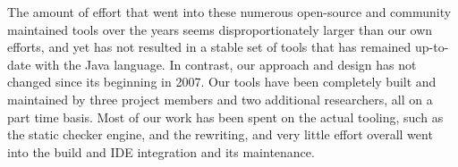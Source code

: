 \documentclass[10pt, conference, compsocconf]{IEEEtran}
\begin{document}
The amount of effort that went into these numerous open-source and
community maintained tools over the years seems disproportionately
larger than our own efforts, and yet has not resulted in a stable set
of tools that has remained up-to-date with the Java language.
In contrast, our
approach and design has not changed since its beginning in 2007. Our
tools have been completely built and maintained by three project
members and two additional researchers, all on a part time basis. Most
of our work has been spent on the actual tooling, such as the static
checker engine, and the rewriting, and very little effort overall went
into the build and IDE integration and its maintenance.









%
%



%
%
\end{document}
